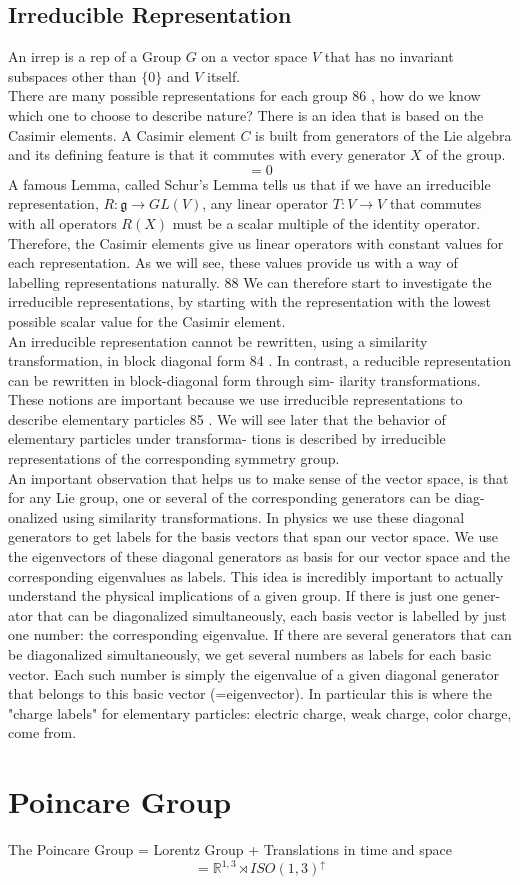 \subsection{Irreducible Representation}
An irrep  is a rep of a Group $G$ on a vector space $V$ that has no invariant subspaces other than $\{ 0 \}$ and $V$ itself.\\
There are many possible representations for each group 86 , how do
we know which one to choose to describe nature? There is an idea
that is based on the Casimir elements. A Casimir element $C$ is built
from generators of the Lie algebra and its defining feature is that it
commutes with every generator $X$ of the group.
\begin{equation}
	[C, X ] = 0
\end{equation}
A famous Lemma, called Schur’s Lemma tells us that if we have an irreducible representation,
$R: \mathfrak{g} \rightarrow GL(V)$, any linear operator $T: V \rightarrow V$ that commutes with all operators $R(X)$ must be a scalar multiple of the identity operator. Therefore,
the Casimir elements give us linear operators with constant values for each representation. As we will see, these values provide us with
a way of labelling representations naturally. 88 We can therefore start
to investigate the irreducible representations, by starting with the
representation with the lowest possible scalar value for the Casimir
element.\\

An irreducible representation cannot be rewritten, using a similarity
transformation, in block diagonal form 84 . In contrast, a reducible
representation can be rewritten in block-diagonal form through sim-
ilarity transformations. These notions are important because we use
irreducible representations to describe elementary particles 85 . We will
see later that the behavior of elementary particles under transforma-
tions is described by irreducible representations of the corresponding
symmetry group.\\
 An important observation
that helps us to make sense of the vector space, is that for any Lie
group, one or several of the corresponding generators can be diag-
onalized using similarity transformations. In physics we use these
diagonal generators to get labels for the basis vectors that span our
vector space. We use the eigenvectors of these diagonal generators
as basis for our vector space and the corresponding eigenvalues as
labels. This idea is incredibly important to actually understand the
physical implications of a given group. If there is just one gener-
ator that can be diagonalized simultaneously, each basis vector is
labelled by just one number: the corresponding eigenvalue. If there
are several generators that can be diagonalized simultaneously, we
get several numbers as labels for each basic vector. Each such number
is simply the eigenvalue of a given diagonal generator that belongs
to this basic vector (=eigenvector). In particular this is where the
"charge labels" for elementary particles: electric charge, weak charge,
color charge, come from. 

\section{Poincare Group}
The Poincare Group = Lorentz Group + Translations in time and space
$$ = \mathbb{R}^{1,3} \rtimes ISO(1,3)^{\uparrow}$$



